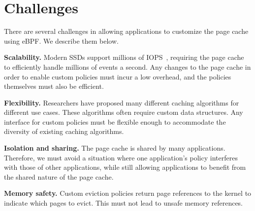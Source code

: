 \section{Challenges}
\label{sec:challenges}

There are several challenges in allowing applications to customize the page cache using eBPF. We describe them below.

\begin{denseenum}
\item \textbf{Scalability.} Modern SSDs support millions of IOPS~\cite{solidigm-specs,western-digital-nvme-specs}, requiring the page cache to efficiently handle millions of events a second. Any changes to the page cache in order to enable custom policies must incur a low overhead, and the policies themselves must also be efficient.


\item \textbf{Flexibility.} Researchers have proposed many different caching algorithms for different use cases. These algorithms often require custom data structures. Any interface for custom policies must be flexible enough to accommodate the diversity of existing caching algorithms.

\item \textbf{Isolation and sharing.} The page cache is shared by many applications. Therefore, we must avoid a situation where one application's policy interferes with those of other applications, while still allowing applications to benefit from the shared nature of the page cache.

\item \textbf{Memory safety.} Custom eviction policies return page references to the kernel to indicate which pages to evict. This must not lead to unsafe memory references. %

\end{denseenum}






